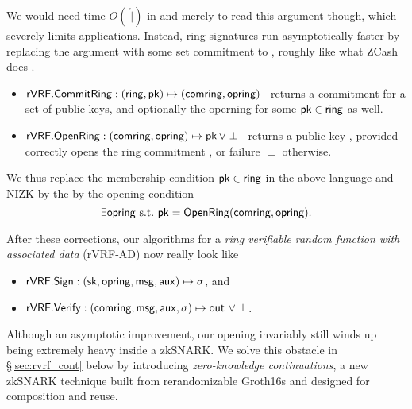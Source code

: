 
We would need time $O(|\ring|)$ in \rSign and \rVerify merely to read
this \ring argument though, which severely limits applications.  Instead,
ring signatures run asymptotically faster by replacing the \ring argument
with some set commitment to \ring, roughly like what ZCash does \cite{zcash_protocol}.
\begin{itemize}
\item ${\mathsf{rVRF}}.{\mathsf{CommitRing}} : (\mathsf{ring},\mathsf{pk}) \mapsto (\mathsf{comring},\mathsf{opring})$ \,
    returns a commitment for a set \ring of public keys, and
    optionally the operning \openring for some $\mathsf{pk} \in \mathsf{ring}$ as well.
\item ${\mathsf{rVRF}}.{\mathsf{OpenRing}} : (\mathsf{comring},\mathsf{opring}) \mapsto \mathsf{pk} \, \lor \perp$ \,
    returns a public key \pk, provided \openring correctly opens
    the ring commitment \comring, or failure $\perp$ otherwise.
\end{itemize}

We thus replace the membership condition $\mathsf{pk} \in \mathsf{ring}$ in the above
language and NIZK by the by the opening condition
$$ \exists \mathsf{opring} \textrm{\ s.t.\ } \mathsf{pk} = {\mathsf{OpenRing}}(\mathsf{comring},\mathsf{opring}) . $$
%


After these corrections,  our algorithms for a
{\em ring verifiable random function with associated data} (rVRF-AD)
now really look like
\begin{itemize}
\item ${\mathsf{rVRF}}.{\mathsf{Sign}} : (\mathsf{sk},\mathsf{opring},\mathsf{msg},\mathsf{aux}) \mapsto \sigma$, \quad and
\item ${\mathsf{rVRF}}.{\mathsf{Verify}} : (\mathsf{comring},\mathsf{msg},\mathsf{aux},\sigma) \mapsto {\ensuremath{\mathsf{out}}} \,\, \lor \perp$.
\end{itemize}

Although an asymptotic improvement, our opening \OpenRing invariably
still winds up being extremely heavy inside a zkSNARK.
We solve this obstacle in \S\ref{sec:rvrf_cont} below by introducing
{\em zero-knowledge continuations}, a new zkSNARK technique built from
rerandomizable Groth16s \cite{Groth16} and designed for composition and reuse.

